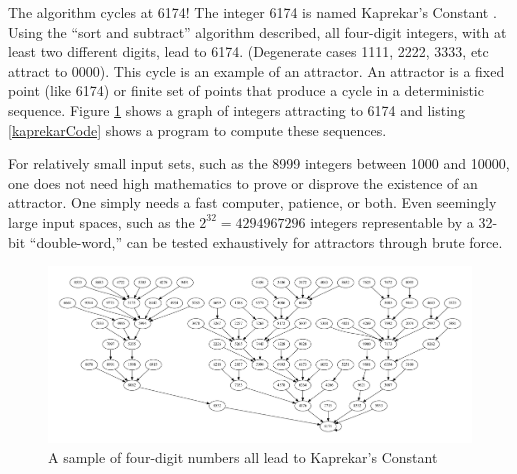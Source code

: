 \documentclass{book}
\begin{document}
The algorithm cycles at 6174! The integer 6174 is named Kaprekar's Constant \cite{seligman_6174}. Using the ``sort and subtract'' algorithm described, all four-digit integers, with at least two different digits, lead to 6174. (Degenerate cases 1111, 2222, 3333, etc attract to 0000). This cycle is an example of an attractor. An attractor is a fixed point (like 6174) or finite set of points that produce a cycle in a deterministic sequence. Figure \ref{kaprekarTree} shows a graph of integers attracting to 6174 and listing \ref{kaprekarCode} shows a program to compute these sequences.

For relatively small input sets, such as the 8999 integers between 1000 and 10000, one does not need high mathematics to prove or disprove the existence of an attractor. One simply needs a fast computer, patience, or both. Even seemingly large input spaces, such as the $2^{32} = 4294967296$ integers representable by a 32-bit ``double-word,'' can be tested exhaustively for attractors through brute force.

\begin{figure}[H]
\centering
\includegraphics[width=\columnwidth]{ch-attractors/kaprekar}
\caption{A sample of four-digit numbers all lead to Kaprekar's Constant}
\label{kaprekarTree}
\end{figure}
\end{document}
